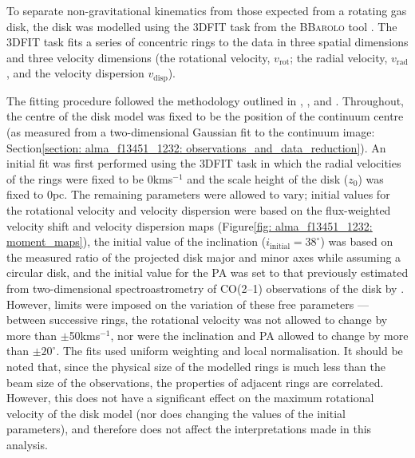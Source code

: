 To separate non-gravitational kinematics from those expected from a rotating gas disk, the disk was modelled using the \textsc{3DFIT} task from the \textsc{BBarolo} tool \citep{DiTeodoro2015}. The \textsc{3DFIT} task fits a series of concentric rings to the data in three spatial dimensions and three velocity dimensions (the rotational velocity, $v_\mathrm{rot}$; the radial velocity, $v_\mathrm{rad}$, and the velocity dispersion $v_\mathrm{disp}$).

The fitting procedure followed the methodology outlined in \citet{AlonsoHerrero2018}, \citet{DominguezFernandez2020}, and \citet{RamosAlmeida2022}. Throughout, the centre of the disk model was fixed to be the position of the continuum centre (as measured from a two-dimensional Gaussian fit to the continuum image: Section\;\ref{section: alma_f13451_1232: observations_and_data_reduction}). An initial fit was first performed using the \textsc{3DFIT} task in which the radial velocities of the rings were fixed to be 0\;km\;s$^{-1}$ and the scale height of the disk ($z_\mathrm{0}$) was fixed to 0\;pc. The remaining parameters were allowed to vary; initial values for the rotational velocity and velocity dispersion were based on the flux-weighted velocity shift and velocity dispersion maps (Figure\;\ref{fig: alma_f13451_1232: moment_maps}), the initial value of the inclination ($i_\mathrm{initial}=38^\circ$) was based on the measured ratio of the projected disk major and minor axes while assuming a circular disk, and the initial value for the PA was set to that previously estimated from two-dimensional spectroastrometry of CO(2--1) observations of the disk by \citet{Lamperti2022}. However, limits were imposed on the variation of these free parameters --- between successive rings, the rotational velocity was not allowed to change by more than $\pm$50\;km\;s$^{-1}$, nor were the inclination and PA allowed to change by more than $\pm20^\circ$. The fits used uniform weighting and local normalisation. It should be noted that, since the physical size of the modelled rings is much less than the beam size of the observations, the properties of adjacent rings are correlated. However, this does not have a significant effect on the maximum rotational velocity of the disk model (nor does changing the values of the initial parameters), and therefore does not affect the interpretations made in this analysis.

